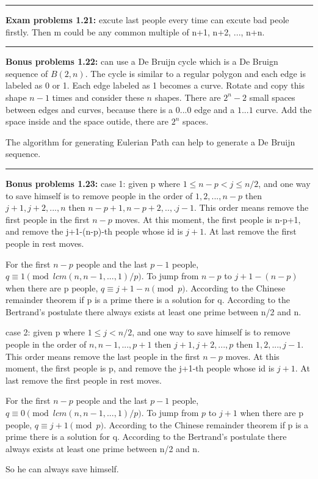 \documentclass{article}
\begin{document}
\noindent\rule{\textwidth}{0.4pt}
\textbf{Exam problems 1.21:}
excute last people every time can excute bad peole firstly.
Then m could be any common multiple of n+1, n+2, ..., n+n.

\noindent\rule{\textwidth}{0.4pt}
\textbf{Bonus problems 1.22:}
can use a De Bruijn cycle which is a De Bruign sequence of $B(2,n)$.
The cycle is similar to a regular polygon and each edge is labeled as 0 or 1.
Each edge labeled as 1 becomes a curve.
Rotate and copy this shape $n-1$ times and consider these $n$ shapes.
There are $2^n-2$ small spaces between edges and curves, because there is a $0...0$ edge and a $1...1$ curve.
Add the space inside and the space outide, there are $2^n$ spaces.

The algorithm for generating Eulerian Path can help to generate a De Bruijn sequence.

\noindent\rule{\textwidth}{0.4pt}
\textbf{Bonus problems 1.23:}
case 1: given p where $1\le n - p < j \le n/2$, and one way to save himself is to remove people in the order of $1,2,...,n-p$ then $j+1,j+2,...,n$ then $n-p+1,n-p+2,..,.j-1$.
This order means remove the first people in the first $n-p$ moves.
At this moment, the first people is n-p+1, and remove the j+1-(n-p)-th people whose id is $j+1$.
At last remove the first people in rest moves.


For the first $n-p$ people and the last $p-1$ people, $q \equiv 1 \pmod{lcm(n,n-1,...,1)/p}$.
To jump from $n-p$ to $j+1-(n-p)$ when there are p people, $q \equiv j+1-n \pmod{p}$.
According to the Chinese remainder theorem if p is a prime there is a solution for q.
According to the Bertrand's postulate there always exists at least one prime between n/2 and n.


case 2: given p where $1\le j < n/2$, and one way to save himself is to remove people in the order of $n,n-1,...,p+1$ then $j+1,j+2,...,p$ then $1,2,...,j-1$.
This order means remove the last people in the first $n-p$ moves.
At this moment, the first people is p, and remove the j+1-th people whose id is $j+1$.
At last remove the first people in rest moves.


For the first $n-p$ people and the last $p-1$ people, $q \equiv 0 \pmod{lcm(n,n-1,...,1)/p}$.
To jump from $p$ to $j+1$ when there are p people, $q \equiv j+1 \pmod{p}$.
According to the Chinese remainder theorem if p is a prime there is a solution for q.
According to the Bertrand's postulate there always exists at least one prime between n/2 and n.


So he can always save himself.
\end{document}
